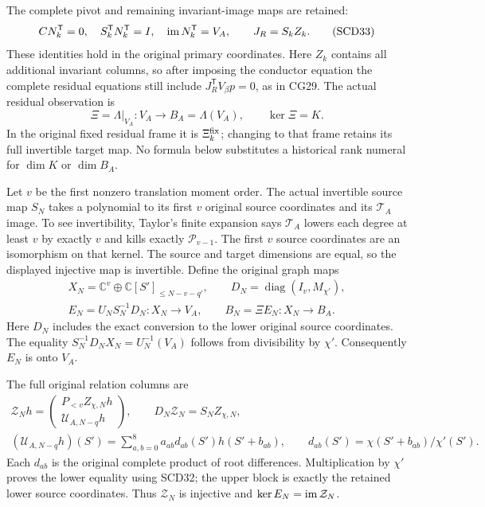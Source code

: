 \documentclass[11pt,a4paper]{article}
\theoremstyle{definition}\newtheorem{definition}[theorem]{Definition}
\newcommand{\C}{\mathbb C}\newcommand{\R}{\mathbb R}
\newcommand{\Pp}{\mathcal P}\newcommand{\LL}{\mathcal L}
\begin{document}
The complete pivot and remaining invariant-image maps are retained:
\[
 CN_k^{\mathsf T}=0,\quad
 S_k^{\mathsf T}N_k^{\mathsf T}=I,\quad
 \operatorname{im} N_k^{\mathsf T}=V_A,\qquad J_R=S_kZ_k .
 \tag{SCD33}
\]
These identities hold in the original primary coordinates.
Here \(Z_k\) contains all additional invariant columns, so after
imposing the conductor equation the complete residual equations
still include \(J_R^{\mathsf T}V_\beta p=0\), as in CG29.
The actual residual observation is
\[
 \Xi=\Lambda|_{V_A}:V_A\to B_A=\Lambda(V_A),\qquad\ker\Xi=K.
\]
In the original fixed residual frame it is \(\Xi_k^{\rm fix}\);
changing to that frame retains its full invertible target map.
No formula below substitutes a historical rank numeral for
\(\dim K\) or \(\dim B_A\).

Let \(v\) be the first nonzero translation moment order. The actual
invertible source map \(S_N\) takes a polynomial to its first \(v\)
original source coordinates and its \(\mathcal T_A\) image.
To see invertibility, Taylor's finite expansion says
\(\mathcal T_A\) lowers each degree at least \(v\) by exactly \(v\)
and kills exactly \(\Pp_{v-1}\). The first \(v\) source coordinates
are an isomorphism on that kernel. The source and target dimensions
are equal, so the displayed injective map is invertible.
Define the original graph maps
\[
 \begin{gathered}
 X_N=\C^v\oplus\C[S']_{\le N-v-q'},\qquad
 D_N=\operatorname{diag}(I_v,M_{\chi'}),\\
 E_N=U_NS_N^{-1}D_N:X_N\to V_A,\qquad
 B_N=\Xi E_N:X_N\to B_A .
 \end{gathered}
 \tag{SCD34}
\]
Here \(D_N\) includes the exact conversion to the lower original
source coordinates. The equality
\(S_N^{-1}D_NX_N=U_N^{-1}(V_A)\) follows from divisibility by
\(\chi'\). Consequently \(E_N\) is onto \(V_A\).

The full original relation columns are
\[
 \begin{gathered}
 \mathcal Z_Nh=
 \begin{pmatrix}P_{<v}Z_{\chi,N}h\\\mathcal U_{A,N-q}h\end{pmatrix},
 \qquad D_N\mathcal Z_N=S_NZ_{\chi,N},\\
 (\mathcal U_{A,N-q}h)(S')
 =\sum_{a,b=0}^8a_{ab}d_{ab}(S')h(S'+b_{ab}),\qquad
 d_{ab}(S')=\chi(S'+b_{ab})/\chi'(S').
 \end{gathered}
 \tag{SCD35}
\]
Each \(d_{ab}\) is the original complete product of root differences.
Multiplication by \(\chi'\) proves the lower equality using SCD32;
the upper block is exactly the retained lower source coordinates.
Thus \(\mathcal Z_N\) is injective and
\(\ker E_N=\operatorname{im}\mathcal Z_N\).
\end{document}
